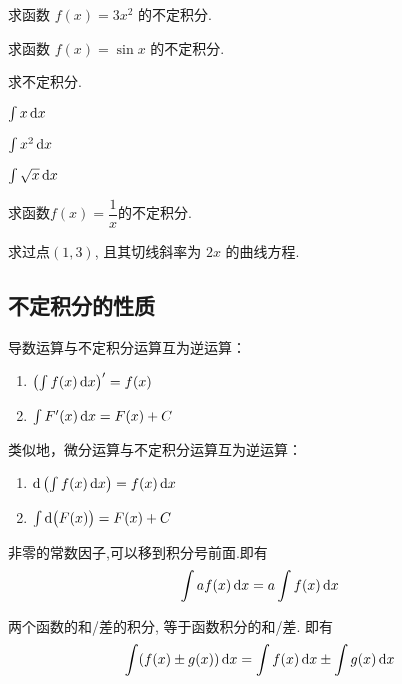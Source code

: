 \documentclass[14pt,notheorems,leqno,xcolor={rgb}]{beamer} %
\begin{document}
\begin{frame}
\begin{example}
求函数 $f(x)=3x^2$ 的不定积分.
\end{example}
\vpause
\begin{example}
求函数 $f(x)=\sin x$ 的不定积分.
\end{example}
\vpause
\begin{exercise}
求不定积分.
\begin{enumlite}
  \item $\int x \mathop{}\!\mathrm{d}{x}$
  \item $\int x^2 \mathop{}\!\mathrm{d}{x}$
  \item $\int \sqrt x \mathop{}\!\mathrm{d}{x}$
\end{enumlite}
\end{exercise}
\end{frame}

\begin{frame}
\begin{example}
求函数$f(x)=\dfrac{1}{x}$的不定积分.
\end{example}
\vpause
\begin{example}
求过点$(1,3)$, 且其切线斜率为 $2x$ 的曲线方程.
\end{example}
\end{frame}

\subsection{不定积分的性质}

\begin{frame}
\begin{property}
导数运算与不定积分运算互为逆运算： %
\begin{enumerate}
  \item $\left(\int f(x)\mathop{}\!\mathrm{d} x\right)'=f(x)$\pause
  \item $\int F'(x)\mathop{}\!\mathrm{d} x = F(x)+C$
\end{enumerate}
\pause 类似地，微分运算与不定积分运算互为逆运算：
\begin{enumerate}
  \item $\mathop{}\!\mathrm{d}\left(\int f(x)\mathop{}\!\mathrm{d} x\right)=f(x)\mathop{}\!\mathrm{d}{x}$
  \item $\int \mathop{}\!\mathrm{d}{\big(F(x)\big)} = F(x)+C$
\end{enumerate}
\end{property}
\end{frame}

\begin{frame}
\begin{property}
非零的常数因子,可以移到积分号前面.即有
\[\int af(x)\mathop{}\!\mathrm{d}{x}= a\int f(x)\mathop{}\!\mathrm{d}{x}\]
\end{property}
\vpause
\begin{property}
两个函数的和/差的积分, 等于函数积分的和/差. 即有
\[\int (f(x)\pm g(x)) \mathop{}\!\mathrm{d}{x} = \int f(x) \mathop{}\!\mathrm{d}{x} \pm \int g(x)\mathop{}\!\mathrm{d}{x} \]
\end{property}
\end{frame}
\end{document}
